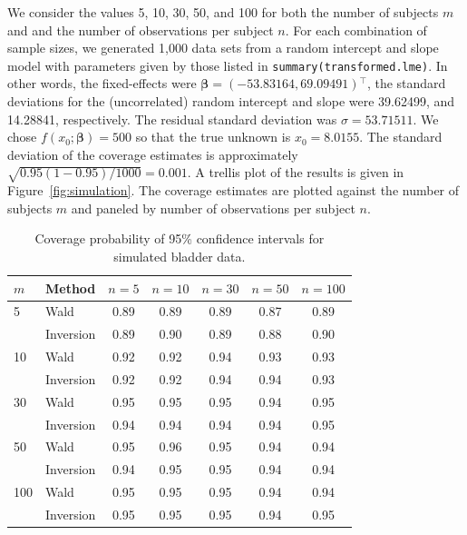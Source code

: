 \documentclass{article}\usepackage[]{graphicx}\usepackage[]{color}
\newcommand{\trans}{\ensuremath{^\top}}
\begin{document}
We consider the values 5, 10, 30, 50, and 100 for both the number of subjects $m$ and and the number of observations per subject $n$.  For each combination of sample sizes, we generated 1,000 data sets from a random intercept and slope model with parameters given by those listed in \texttt{summary(transformed.lme)}.  In other words, the fixed-effects were $\bm{\beta} = \left(-53.83164, 69.09491\right)\trans$, the standard deviations for the (uncorrelated) random intercept and slope were 39.62499, and 14.28841, respectively.  The residual standard deviation was $\sigma = 53.71511$.  We chose $f\left(x_0; \bm{\beta}\right) = 500$ so that the true unknown is $x_0 = 8.0155$.  The standard deviation of the coverage estimates is approximately $\sqrt{0.95\left(1-0.95\right)/1000} = 0.001$.  A trellis plot of the results is given in Figure~\ref{fig:simulation}.  The coverage estimates are plotted against the number of subjects $m$ and paneled by number of observations per subject $n$.
\begin{table}[!htb]
\centering
\begin{tabular}{llccccc}
  \toprule
  $m$  & Method    & \hspace{8pt}$n = 5$\hspace{8pt} & \hspace{8pt}$n = 10$\hspace{8pt} & \hspace{8pt}$n = 30$\hspace{8pt} & \hspace{8pt}$n = 50$\hspace{8pt} & \hspace{8pt}$n = 100$ \hspace{8pt} \\
  \hline
  5    & Wald      & 0.89    & 0.89     & 0.89     & 0.87     & 0.89      \\
       & Inversion & 0.89    & 0.90     & 0.89     & 0.88     & 0.90      \\ \hline
  10   & Wald      & 0.92    & 0.92     & 0.94     & 0.93     & 0.93      \\
       & Inversion & 0.92    & 0.92     & 0.94     & 0.94     & 0.93      \\ \hline
  30   & Wald      & 0.95    & 0.95     & 0.95     & 0.94     & 0.95      \\
       & Inversion & 0.94    & 0.94     & 0.94     & 0.94     & 0.95      \\ \hline
  50   & Wald      & 0.95    & 0.96     & 0.95     & 0.94     & 0.94      \\
       & Inversion & 0.94    & 0.95     & 0.95     & 0.94     & 0.94      \\ \hline
  100  & Wald      & 0.95    & 0.95     & 0.95     & 0.94     & 0.94      \\
       & Inversion & 0.95    & 0.95     & 0.95     & 0.94     & 0.95      \\
  \bottomrule
\end{tabular}
\caption{Coverage probability of 95\% confidence intervals for simulated bladder data. \label{tab:simulation}}
\end{table}%
\end{document}
